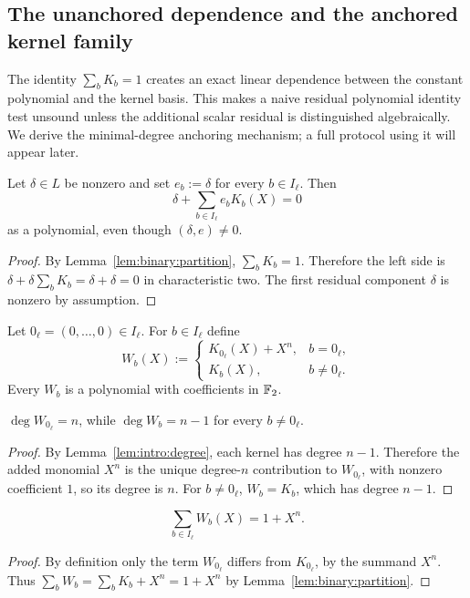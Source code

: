 \subsection{The unanchored dependence and the anchored kernel family}\label{sec:binary:anchors}

The identity $\sum_bK_b=1$ creates an exact linear
dependence between the constant polynomial and the
kernel basis. This makes a naive residual polynomial
identity test unsound unless the additional scalar
residual is distinguished algebraically.
We derive the minimal-degree anchoring mechanism;
a full protocol using it will appear later.

\begin{lemma}\label{lem:binary:unanchored}
Let $\delta\in L$ be nonzero and set $e_b:=\delta$ for
every $b\in I_\ell$. Then
\[
 \delta+\sum_{b\in I_\ell}e_bK_b(X)=0
\]
as a polynomial, even though $(\delta,e)\neq0$.
\end{lemma}
\begin{proof}
By Lemma~\ref{lem:binary:partition},
$\sum_bK_b=1$. Therefore the left side is
$\delta+\delta\sum_bK_b=\delta+\delta=0$
in characteristic two. The first residual component
$\delta$ is nonzero by assumption.
\end{proof}

\begin{definition}\label{def:binary:anchored}
Let $0_\ell=(0,\ldots,0)\in I_\ell$. For $b\in I_\ell$ define
\[
 W_b(X):=
 \begin{cases}
 K_{0_\ell}(X)+X^n,&b=0_\ell,\\
 K_b(X),&b\neq0_\ell.
 \end{cases}
\]
Every $W_b$ is a polynomial with coefficients in $\mathbb{F}_2$.
\end{definition}

\begin{lemma}\label{lem:binary:anchor-degree}
$\deg W_{0_\ell}=n$, while
$\deg W_b=n-1$ for every $b\neq0_\ell$.
\end{lemma}
\begin{proof}
By Lemma~\ref{lem:intro:degree}, each kernel has degree
$n-1$. Therefore the added monomial $X^n$ is the
unique degree-$n$ contribution to $W_{0_\ell}$,
with nonzero coefficient $1$, so its degree is $n$.
For $b\neq0_\ell$, $W_b=K_b$, which has degree $n-1$.
\end{proof}

\begin{lemma}\label{lem:binary:anchor-sum}
\[
 \sum_{b\in I_\ell}W_b(X)=1+X^n.
\]
\end{lemma}
\begin{proof}
By definition only the term $W_{0_\ell}$
differs from $K_{0_\ell}$, by the summand $X^n$.
Thus $\sum_bW_b=\sum_bK_b+X^n=1+X^n$
by Lemma~\ref{lem:binary:partition}.
\end{proof}


